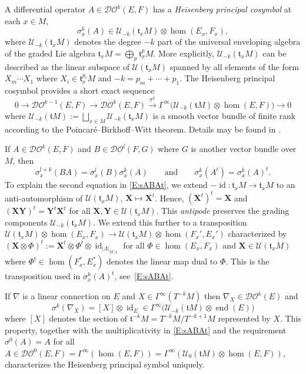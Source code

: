 \documentclass[reqno,12pt]{amsart}
\DeclareMathOperator{\id}{id}
\DeclareMathOperator{\eend}{end}
\newcommand{\DO}{\mathcal D\mathcal O}
\theoremstyle{plain}
\theoremstyle{definition}
\begin{document}
A differential operator $A\in\DO^k(E,F)$ has a \emph{Heisenberg principal cosymbol} at each $x\in M$,
$$
\sigma_x^k(A)\in\mathcal U_{-k}(\mathfrak t_xM)\otimes\hom(E_x,F_x),
$$
where $\mathcal U_{-k}(\mathfrak t_xM)$ denotes the degree $-k$ part of the universal enveloping algebra of the graded Lie algebra $\mathfrak t_xM=\bigoplus_p\mathfrak t_x^pM$.
More explicitly, $\mathcal U_{-k}(\mathfrak t_xM)$ can be described as the linear subspace of $\mathcal U(\mathfrak t_xM)$ spanned by all elements of the form $X_m\cdots X_1$ where $X_i\in\mathfrak t_x^{p_i}M$ and $-k=p_m+\cdots+p_1$.
The Heisenberg principal cosymbol provides a short exact sequence
$$
0\to\DO^{k-1}(E,F)\to\DO^k(E,F)\xrightarrow{\sigma^k}\Gamma^\infty\bigl(\mathcal U_{-k}(\mathfrak tM)\otimes\hom(E,F)\bigr)\to0
$$
where $\mathcal U_{-k}(\mathfrak tM):=\bigsqcup_{x\in M}\mathcal U_{-k}(\mathfrak t_xM)$ is a smooth vector bundle of finite rank according to the Poincar\'e--Birkhoff--Witt theorem.
Details may be found in \cite[Section~1.2.5]{N10}.


If $A\in\DO^k(E,F)$ and $B\in\DO^l(F,G)$ where $G$ is another vector bundle over $M$, then
\begin{equation}\label{E:sABAt}
\sigma_x^{l+k}(BA)=\sigma_x^l(B)\sigma^k_x(A)
\qquad\text{and}\qquad
\sigma_x^k(A^t)=\sigma_x^k(A)^t.
\end{equation}
To explain the second equation in \eqref{E:sABAt}, we extend $-\id\colon\mathfrak t_xM\to\mathfrak t_xM$ to an anti-automorphism of $\mathcal U(\mathfrak t_xM)$, $\mathbf X\mapsto\mathbf X^t$.
Hence, $(\mathbf X^t)^t=\mathbf X$ and $(\mathbf X\mathbf Y)^t=\mathbf Y^t\mathbf X^t$ for all $\mathbf X,\mathbf Y\in\mathcal U(\mathfrak t_xM)$.
This \emph{antipode} preserves the grading components $\mathcal U_{-k}(\mathfrak t_xM)$.
We extend this further to a transposition $\mathcal U(\mathfrak t_xM)\otimes\hom(E_x,F_x)\to\mathcal U(\mathfrak t_xM)\otimes\hom(F_x',E_x')$ characterized by $(\mathbf X\otimes\Phi)^t:=\mathbf X^t\otimes\Phi^t\otimes\id_{|\Lambda|_{M,x}}$ for all $\Phi\in\hom(E_x,F_x)$ and $\mathbf X\in\mathcal U(\mathfrak t_xM)$ where $\Phi^t\in\hom(F_x^*,E_x^*)$ denotes the linear map dual to $\Phi$.
This is the transposition used in $\sigma_x^k(A)^t$, see~\eqref{E:sABAt}.


If $\nabla$ is a linear connection on $E$ and $X\in\Gamma^\infty(T^{-k}M)$ then $\nabla_X\in\DO^k(E)$ and
\begin{equation}\label{E:snablaX}
\sigma^k(\nabla_X)=[X]\otimes\id_E\in\Gamma^\infty\bigl(\mathcal U_{-k}(\mathfrak tM)\otimes\eend(E)\bigr)
\end{equation}
where $[X]$ denotes the section of $\mathfrak t^{-k}M=T^{-k}M/T^{-k+1}M$ represented by $X$.
This property, together with the multiplicativity in \eqref{E:sABAt} and the requirement $\sigma^0(A)=A$ for all $A\in\DO^0(E,F)=\Gamma^\infty(\hom(E,F))=\Gamma^\infty(\mathcal U_0(\mathfrak tM)\otimes\hom(E,F))$, characterizes the Heisenberg principal symbol uniquely.
\end{document}

